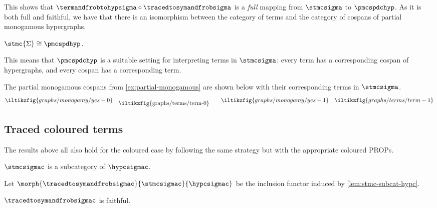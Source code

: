 \begin{example}
\end{example}

This shows that \(
\termandfrobtohypsigma \circ \tracedtosymandfrobsigma
\) is a \emph{full} mapping from \(\stmcsigma\) to \(\pmcspdchyp\).
As it is both full and faithful, we have that there is an isomorphism
between the category of terms and the category of cospans of partial
monogamous hypergraphs.

\begin{corollary}\label{cor:stmc-graph-iso}
    \(\stmc{\Sigma} \cong \pmcspdhyp\).
\end{corollary}

This means that \(\pmcspdchyp\) is a suitable setting for interpreting terms in
\(\stmcsigma\): every term has a corresponding cospan of hypergraphs, and
every cospan has a corresponding term.

\begin{example}
    The partial monogamous cospans from \cref{ex:partial-monogamous} are shown
    below with their corresponding terms in \(\stmcsigma\).
    \[
        \iltikzfig{graphs/monogamy/yes-0}
        \quad
        \raisebox{-0.5em}{\iltikzfig{graphs/terms/term-0}}
        \qquad
        \iltikzfig{graphs/monogamy/yes-1}
        \quad
        \iltikzfig{graphs/terms/term-1}
    \]
\end{example}

\subsection{Traced coloured terms}

The results above all also hold for the coloured case by following the same
strategy but with the appropriate coloured PROPs.

\begin{lemma}\label{lem:stmc-subcat-hypc}
    \(\stmcsigmac\) is a subcategory of \(\hypcsigmac\).
\end{lemma}

\begin{definition}
    Let \(\morph{\tracedtosymandfrobsigmac}{\stmcsigmac}{\hypcsigmac}\) be the
    inclusion functor induced by \cref{lem:stmc-subcat-hypc}.
\end{definition}

\begin{corollary}
    \(\tracedtosymandfrobsigmac\) is faithful.
\end{corollary}

